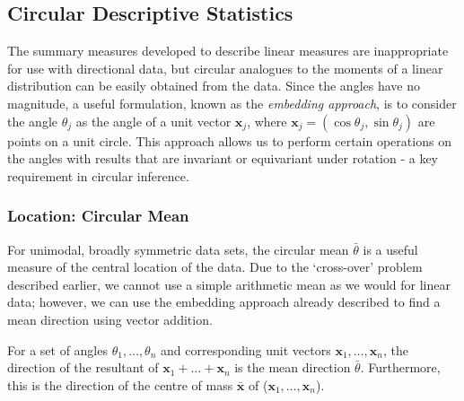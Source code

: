 \documentclass[../../ArchStats.tex]{subfiles}
\begin{document}


\subsection{Circular Descriptive Statistics}

The summary measures developed to describe linear measures are inappropriate for use with directional data, but circular analogues to the moments of a linear distribution can be easily obtained from the data. Since the angles have no magnitude, a useful formulation, known as the \textit{embedding approach}, is to consider the angle $\theta_j$ as the angle of a unit vector $\mathbf{x}_j$, where $\mathbf{x}_j = (\cos\theta_j, \sin\theta_j)$ are points on a unit circle. This approach allows us to perform certain operations on the angles with results that are invariant or equivariant under rotation - a key requirement in circular inference.


\subsubsection{Location: Circular Mean}

For unimodal, broadly symmetric data sets, the circular mean $\bar{\theta}$ is a useful measure of the central location of the data. Due to the `cross-over' problem described earlier, we cannot use a simple arithmetic mean as we would for linear data; however, we can use the embedding approach already described to find a mean direction using vector addition. 

For a set of angles $\theta_1, \dots, \theta_n$ and corresponding unit vectors $\mathbf{x}_1, \dots, \mathbf{x}_n$, the direction of the resultant of $\mathbf{x}_1 + \dots + \mathbf{x}_n$ is the mean direction $\bar{\theta}$. Furthermore, this is the direction of the centre of mass $\mathbf{\bar{x}}$ of ($\mathbf{x}_1, \dots, \mathbf{x}_n$).
\end{document}
